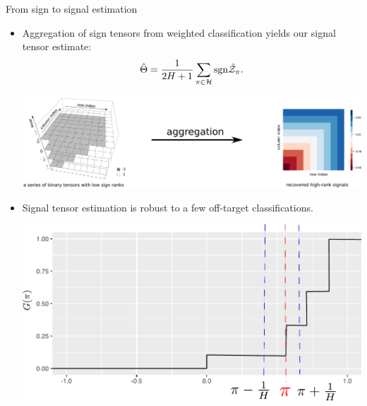 \documentclass[10pt, mathserif]{beamer} %
\theoremstyle{definition}
\theoremstyle{plain}
\begin{document}
\begin{frame}{From sign to signal estimation}
  
    \begin{itemize}
    \item Aggregation of sign tensors from weighted classification yields our signal tensor estimate:
    \begin{align}
        \hat\Theta = {1\over 2H+1}\sum_{\pi\in\mathcal{H}}\text{sgn}\hat {\mathcal{Z}}_\pi.
    \end{align}
    \vspace{-.5cm}
        \begin{center}
    \includegraphics[width = .9\textwidth]{Figures/aggregation.pdf}
    \end{center}
    \item Signal tensor estimation is robust to a few off-target classifications. 
    
        \begin{center}
    \includegraphics[width =.4\textwidth]{Figures/cdf_new_ave.pdf}
    \end{center}
    
    \end{itemize}

\end{frame}
\end{document}
